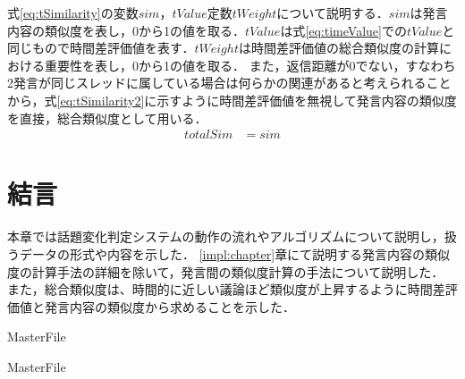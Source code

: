 式\ref{eq:tSimilarity}の変数$sim$，$tValue$定数$tWeight$について説明する．$sim$は発言内容の類似度を表し，0から1の値を取る．$tValue$は式\ref{eq:timeValue}での$tValue$と同じもので時間差評価値を表す．$tWeight$は時間差評価値の総合類似度の計算における重要性を表し，0から1の値を取る．
また，返信距離が0でない，すなわち2発言が同じスレッドに属している場合は何らかの関連があると考えられることから，式\ref{eq:tSimilarity2}に示すように時間差評価値を無視して発言内容の類似度を直接，総合類似度として用いる．
\begin{equation}
\begin{aligned}
\label{eq:tSimilarity2}
totalSim & =  sim
\end{aligned}
\end{equation}

\section{結言}
\label{model:conclusion}
本章では話題変化判定システムの動作の流れやアルゴリズムについて説明し，扱うデータの形式や内容を示した．
\ref{impl:chapter}章にて説明する発言内容の類似度の計算手法の詳細を除いて，発言間の類似度計算の手法について説明した．
また，総合類似度は、時間的に近しい議論ほど類似度が上昇するように時間差評価値と発言内容の類似度から求めることを示した．

 \expandafter\ifx\csname MasterFile\endcsname\relax
	\def\BibFile{hoge}
	
  \fi
  \expandafter\ifx\csname MasterFile\endcsname\relax
  
  \fi
